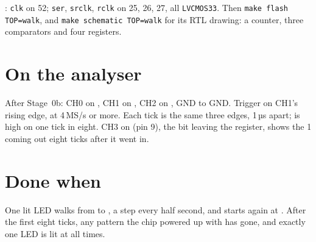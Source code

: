 \documentclass[11pt,a4paper]{article}
\begin{document}
: \texttt{clk} on 52; \texttt{ser}, \texttt{srclk}, \texttt{rclk} on 25, 26, 27, all \texttt{LVCMOS33}. Then \texttt{make flash TOP=walk}, and \texttt{make schematic TOP=walk} for its RTL drawing: a counter, three comparators and four registers.

\section*{On the analyser}

After Stage~0b: CH0 on , CH1 on , CH2 on , GND to GND. Trigger on CH1’s rising edge, at 4\,MS/s or more. Each tick is the same three edges, 1\,µs apart;  is high on one tick in eight. CH3 on  (pin 9), the bit leaving the register, shows the 1 coming out eight ticks after it went in.

\section*{Done when}

One lit LED walks from  to , a step every half second, and starts again at . After the first eight ticks, any pattern the chip powered up with has gone, and exactly one LED is lit at all times.
\end{document}
